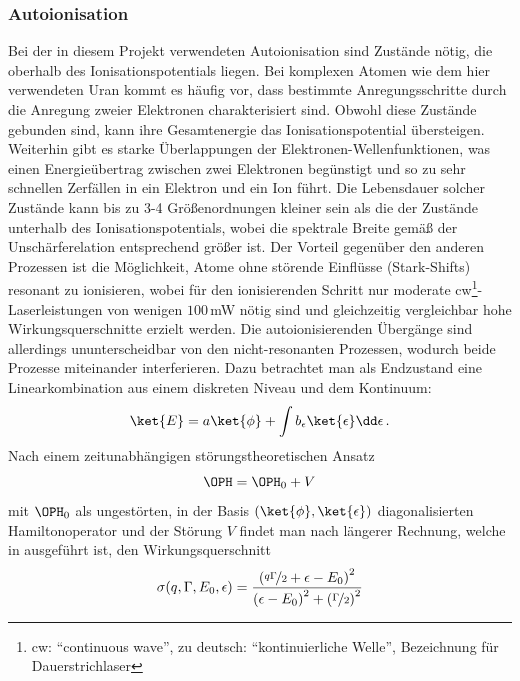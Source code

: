 \subsubsection{Autoionisation}\label{subsubsec:autoionisation}
Bei der in diesem Projekt verwendeten Autoionisation sind Zustände nötig, die
oberhalb des Ionisationspotentials liegen. Bei komplexen Atomen wie dem hier
verwendeten Uran kommt es häufig vor, dass bestimmte Anregungsschritte durch die
Anregung zweier Elektronen charakterisiert sind. Obwohl diese Zustände
gebunden sind, kann ihre Gesamtenergie das Ionisationspotential
übersteigen. Weiterhin gibt es starke Überlappungen der
Elektronen-Wellenfunktionen, was einen Energieübertrag zwischen zwei Elektronen begünstigt und so zu sehr schnellen Zerfällen in ein Elektron und ein Ion führt. Die Lebensdauer solcher Zustände
kann bis zu 3-4 Größenordnungen kleiner sein als die der Zustände unterhalb des
Ionisationspotentials, wobei die spektrale Breite gemäß der
Unschärferelation entsprechend größer ist. Der Vorteil gegenüber den anderen
Prozessen ist die Möglichkeit, Atome ohne störende Einflüsse (Stark-Shifts)
resonant zu ionisieren, wobei für den ionisierenden Schritt nur moderate cw\footnote{cw:
"`continuous wave"', zu deutsch: "`kontinuierliche Welle"', Bezeichnung für Dauerstrichlaser}-Laserleistungen von
wenigen $100\,$mW nötig sind und gleichzeitig vergleichbar hohe
Wirkungsquerschnitte erzielt werden. Die autoionisierenden Übergänge sind
allerdings ununterscheidbar von den nicht-resonanten Prozessen, wodurch
beide Prozesse miteinander interferieren. Dazu betrachtet man als Endzustand
eine Linearkombination aus einem diskreten Niveau und dem Kontinuum:
\begin{equation}\label{eq:uebergang_diskret_kontinuum}
	\ket{E}=a\ket{\phi}+\int b_\epsilon\ket{\epsilon}\dd\epsilon\,.
\end{equation}
Nach einem zeitunabhängigen störungstheoretischen Ansatz
\begin{equation}\label{eq:uebergang_diskret_kontinuum_hamilton}
	\OPH=\OPH_0+V
\end{equation}
mit $\OPH_0$ als ungestörten, in der Basis
$\left(\ket{\phi}\text{,}\,\ket{\epsilon}\right)$ diagonalisierten
Hamiltonoperator und der Störung $V$ findet man nach längerer Rechnung,
welche in \cite{fano:1961:PhysRev.124.1866} ausgeführt ist, den
Wirkungsquerschnitt
\begin{equation}\label{eq:fano-profil}
	\sigma(q,\Gamma,E_0,\epsilon)=\frac{\left(\nicefrac{q\Gamma}{2}+\epsilon-E_0\right)^2}{\left(\epsilon-E_0\right)^2+\left(\nicefrac{\Gamma}{2}\right)^2}
\end{equation}
